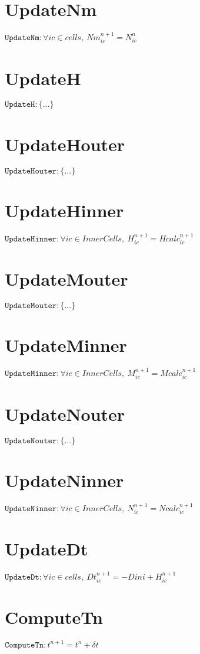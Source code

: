 \documentclass[11pt]{article}
\begin{document}
\section{UpdateNm}
$\texttt{UpdateNm} : \forall{ic\in cells}, \ Nm^{n+1}_{ic} = N^{n}_{ic}$


\section{UpdateH}
$\texttt{UpdateH} : \{ ... \}$


\section{UpdateHouter}
$\texttt{UpdateHouter} : \{ ... \}$


\section{UpdateHinner}
$\texttt{UpdateHinner} : \forall{ic\in InnerCells}, \ H^{n+1}_{ic} = Hcalc^{n+1}_{ic}$


\section{UpdateMouter}
$\texttt{UpdateMouter} : \{ ... \}$


\section{UpdateMinner}
$\texttt{UpdateMinner} : \forall{ic\in InnerCells}, \ M^{n+1}_{ic} = Mcalc^{n+1}_{ic}$


\section{UpdateNouter}
$\texttt{UpdateNouter} : \{ ... \}$


\section{UpdateNinner}
$\texttt{UpdateNinner} : \forall{ic\in InnerCells}, \ N^{n+1}_{ic} = Ncalc^{n+1}_{ic}$


\section{UpdateDt}
$\texttt{UpdateDt} : \forall{ic\in cells}, \ Dt^{n+1}_{ic} = -Dini + H^{n+1}_{ic}$


\section{ComputeTn}
$\texttt{ComputeTn} : t^{n+1} = t^{n} + \delta t$
\end{document}
